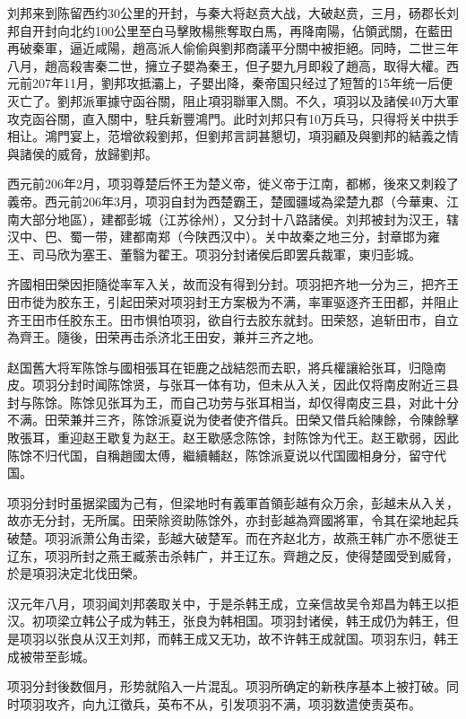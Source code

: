 刘邦来到陈留西约30公里的开封，与秦大将赵贲大战，大破赵贲，三月，砀郡长刘邦自开封向北约100公里至白马擊敗楊熊奪取白馬，再降南陽，佔領武關，在藍田再破秦軍，逼近咸陽，趙高派人偷偷與劉邦商議平分關中被拒絕。同時，二世三年八月，趙高殺害秦二世，擁立子嬰為秦王，但子嬰九月即殺了趙高，取得大權。西元前207年11月，劉邦攻抵灞上，子嬰出降，秦帝国只经过了短暂的15年统一后便灭亡了。劉邦派軍據守函谷關，阻止項羽聯軍入關。不久，項羽以及諸侯40万大軍攻克函谷關，直入關中，駐兵新豐鴻門。此时刘邦只有10万兵马，只得将关中拱手相让。鴻門宴上，范增欲殺劉邦，但劉邦言詞甚懇切，項羽顧及與劉邦的結義之情與諸侯的威脅，放歸劉邦。

西元前206年2月，项羽尊楚后怀王为楚义帝，徙义帝于江南，都郴，後來又刺殺了義帝。西元前206年3月，项羽自封为西楚霸王，楚國疆域為梁楚九郡（今華東、江南大部分地區），建都彭城（江苏徐州），又分封十八路諸侯。刘邦被封为汉王，辖汉中、巴、蜀一带，建都南郑（今陕西汉中）。关中故秦之地三分，封章邯为雍王、司马欣为塞王、董翳为翟王。项羽分封诸侯后即罢兵裁軍，東归彭城。

齐國相田榮因拒隨從率军入关，故而没有得到分封。项羽把齐地一分为三，把齐王田市徙为胶东王，引起田荣对项羽封王方案极为不满，率軍驱逐齐王田都，并阻止齐王田市任胶东王。田市惧怕项羽，欲自行去胶东就封。田荣怒，追斩田市，自立為齊王。隨後，田荣再击杀济北王田安，兼并三齐之地。

赵国舊大将军陈馀与國相張耳在钜鹿之战結怨而去职，將兵權讓給张耳，归隐南皮。项羽分封时闻陈馀贤，与张耳一体有功，但未从入关，因此仅将南皮附近三县封与陈馀。陈馀见张耳为王，而自己功劳与张耳相当，却仅得南皮三县，对此十分不满。田荣兼并三齐，陈馀派夏说为使者使齐借兵。田榮又借兵給陳餘，令陳餘擊敗張耳，重迎赵王歇复为赵王。赵王歇感念陈馀，封陈馀为代王。赵王歇弱，因此陈馀不归代国，自稱趙國太傅，繼續輔赵，陈馀派夏说以代国國相身分，留守代国。

项羽分封时虽据梁國为己有，但梁地时有義軍首領彭越有众万余，彭越未从入关，故亦无分封，无所属。田荣除资助陈馀外，亦封彭越為齊國將軍，令其在梁地起兵破楚。项羽派萧公角击梁，彭越大破楚军。而在齐赵北方，故燕王韩广亦不愿徙王辽东，项羽所封之燕王臧荼击杀韩广，并王辽东。齊趙之反，使得楚國受到威脅，於是項羽決定北伐田榮。

汉元年八月，项羽闻刘邦袭取关中，于是杀韩王成，立亲信故吴令郑昌为韩王以拒汉。初项梁立韩公子成为韩王，张良为韩相国。项羽封诸侯，韩王成仍为韩王，但是项羽以张良从汉王刘邦，而韩王成又无功，故不许韩王成就国。项羽东归，韩王成被带至彭城。

项羽分封後数個月，形势就陷入一片混乱。项羽所确定的新秩序基本上被打破。同时项羽攻齐，向九江徵兵，英布不从，引发项羽不满，项羽数遣使责英布。

